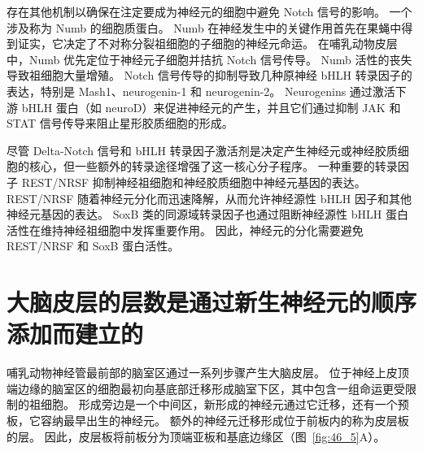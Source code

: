 存在其他机制以确保在注定要成为神经元的细胞中避免 Notch 信号的影响。
一个涉及称为 Numb 的细胞质蛋白。
Numb 在神经发生中的关键作用首先在果蝇中得到证实，它决定了不对称分裂祖细胞的子细胞的神经元命运。
在哺乳动物皮层中，Numb 优先定位于神经元子细胞并拮抗 Notch 信号传导。
Numb 活性的丧失导致祖细胞大量增殖。
Notch 信号传导的抑制导致几种原神经 bHLH 转录因子的表达，特别是 Mash1、neurogenin-1 和 neurogenin-2。
Neurogenins 通过激活下游 bHLH 蛋白（如 neuroD）来促进神经元的产生，并且它们通过抑制 JAK 和 STAT 信号传导来阻止星形胶质细胞的形成。


尽管 Delta-Notch 信号和 bHLH 转录因子激活剂是决定产生神经元或神经胶质细胞的核心，但一些额外的转录途径增强了这一核心分子程序。
一种重要的转录因子 REST/NRSF 抑制神经祖细胞和神经胶质细胞中神经元基因的表达。
REST/NRSF 随着神经元分化而迅速降解，从而允许神经源性 bHLH 因子和其他神经元基因的表达。
SoxB 类的同源域转录因子也通过阻断神经源性 bHLH 蛋白活性在维持神经祖细胞中发挥重要作用。
因此，神经元的分化需要避免 REST/NRSF 和 SoxB 蛋白活性。



\section{大脑皮层的层数是通过新生神经元的顺序添加而建立的}

哺乳动物神经管最前部的脑室区通过一系列步骤产生大脑皮层。
位于神经上皮顶端边缘的脑室区的细胞最初向基底部迁移形成脑室下区，其中包含一组命运更受限制的祖细胞。
形成旁边是一个中间区，新形成的神经元通过它迁移，还有一个预板，它容纳最早出生的神经元。
额外的神经元迁移形成位于前板内的称为皮层板的层。 
因此，皮层板将前板分为顶端亚板和基底边缘区（图~\ref{fig:46_5}A）。


